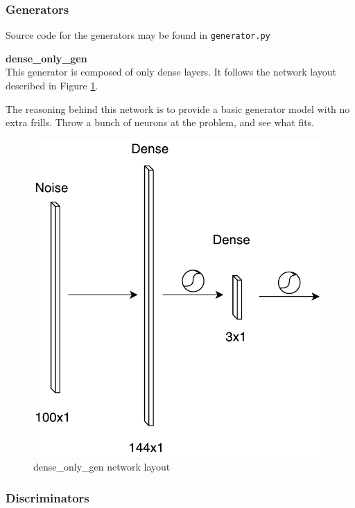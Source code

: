 \documentclass[12pt]{article}
\begin{document}
\subsubsection{Generators}

Source code for the generators may be found in \texttt{generator.py}

\noindent \textbf{dense\_only\_gen} \\

This generator is composed of only dense layers. It follows the network layout described in Figure \ref{fig:dense_only_gen}.

The reasoning behind this network is to provide a basic generator model with no extra frills. Throw a bunch of neurons at the problem, and see what fits.

\begin{figure}[ht]
    \centering
    \includegraphics[scale=0.65]{img/dense_only_gen}
    \caption{dense\_only\_gen network layout}
    \label{fig:dense_only_gen}
\end{figure}

\subsubsection{Discriminators}
\end{document}
